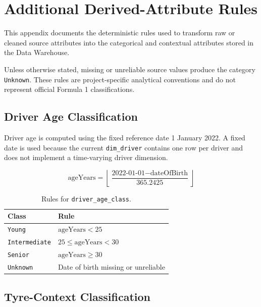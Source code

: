 \documentclass[11pt,a4paper]{article}
\begin{document}
	

	
	\newpage
	\section{Additional Derived-Attribute Rules}
	\label{appendix:derived-attribute-rules}
	
	This appendix documents the deterministic rules used to transform
	raw or cleaned source attributes into the categorical and contextual
	attributes stored in the Data Warehouse.
	
	Unless otherwise stated, missing or unreliable source values produce
	the category \texttt{Unknown}. These rules are project-specific
	analytical conventions and do not represent official Formula 1
	classifications.
	
	
	\subsection{Driver Age Classification}
	
	Driver age is computed using the fixed reference date
	1 January 2022. A fixed date is used because the current
	\texttt{dim\_driver} contains one row per driver and does not
	implement a time-varying driver dimension.
	
	\[
	\text{ageYears} =
	\left\lfloor
	\frac{\text{2022-01-01} - \text{dateOfBirth}}
	{365.2425}
	\right\rfloor
	\]
	
	\begin{table}[H]
		\centering
		\caption{Rules for \texttt{driver\_age\_class}.}
		\begin{tabularx}{0.80\linewidth}{p{3.5cm}X}
			\toprule
			\textbf{Class} & \textbf{Rule} \\
			\midrule
			\texttt{Young} & $\text{ageYears} < 25$ \\
			\texttt{Intermediate} & $25 \leq \text{ageYears} < 30$ \\
			\texttt{Senior} & $\text{ageYears} \geq 30$ \\
			\texttt{Unknown} & Date of birth missing or unreliable \\
			\bottomrule
		\end{tabularx}
	\end{table}
	
	
	\subsection{Tyre-Context Classification}
	
\end{document}
